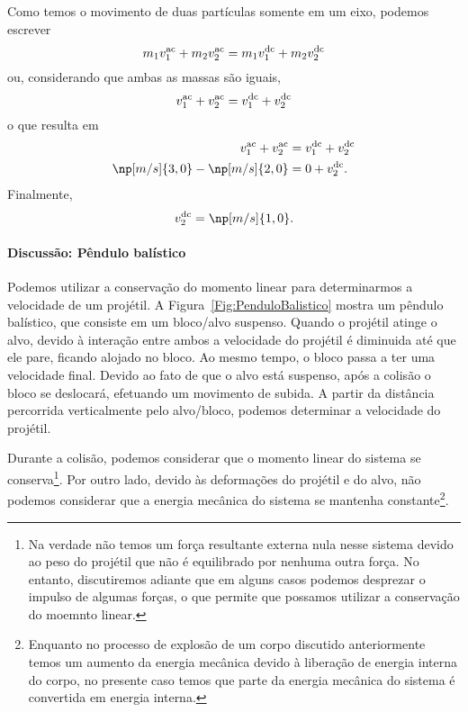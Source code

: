 Como temos o movimento de duas partículas somente em um eixo, podemos escrever
\begin{equation}
        m_1 v_1^{\rm{ac}} + m_2 v_2^{\rm{ac}} = m_1 v_1^{\rm{dc}} + m_2 v_2^{\rm{dc}}
\end{equation}
%
ou, considerando que ambas as massas são iguais,
\begin{equation}
        v_1^{\rm{ac}} + v_2^{\rm{ac}} = v_1^{\rm{dc}} + v_2^{\rm{dc}}
\end{equation}
%
o que resulta em
\begin{align}
    v_1^{\rm{ac}} + v_2^{\rm{ac}} &= v_1^{\rm{dc}} + v_2^{\rm{dc}} \\
    \np[m/s]{3,0} - \np[m/s]{2,0} &= 0 + v_2^{\rm{dc}}.
\end{align}
%
Finalmente,
\begin{equation}
    v_2^{\rm{dc}} = \np[m/s]{1,0}.
\end{equation}

\paragraph{Discussão: Pêndulo balístico}

Podemos utilizar a conservação do momento linear para determinarmos a velocidade de um projétil. A Figura~\ref{Fig:PenduloBalistico} mostra um pêndulo balístico, que consiste em um bloco/alvo suspenso. Quando o projétil atinge o alvo, devido à interação entre ambos a velocidade do projétil é diminuida até que ele pare, ficando alojado no bloco. Ao mesmo tempo, o bloco passa a ter uma velocidade final. Devido ao fato de que o alvo está suspenso, após a colisão o bloco se deslocará, efetuando um movimento de subida. A partir da distância percorrida verticalmente pelo alvo/bloco, podemos determinar a velocidade do projétil.

Durante a colisão, podemos considerar que o momento linear do sistema se conserva\footnote{Na verdade não temos um força resultante externa nula nesse sistema devido ao peso do projétil que não é equilibrado por nenhuma outra força. No entanto, discutiremos adiante que em alguns casos podemos desprezar o impulso de algumas forças, o que permite que possamos utilizar a conservação do moemnto linear.}. Por outro lado, devido às deformações do projétil e do alvo, não podemos considerar que a energia mecânica do sistema se mantenha constante\footnote{Enquanto no processo de explosão de um corpo discutido anteriormente temos um aumento da energia mecânica devido à liberação de energia interna do corpo, no presente caso temos que parte da energia mecânica do sistema é convertida em energia interna.}.

